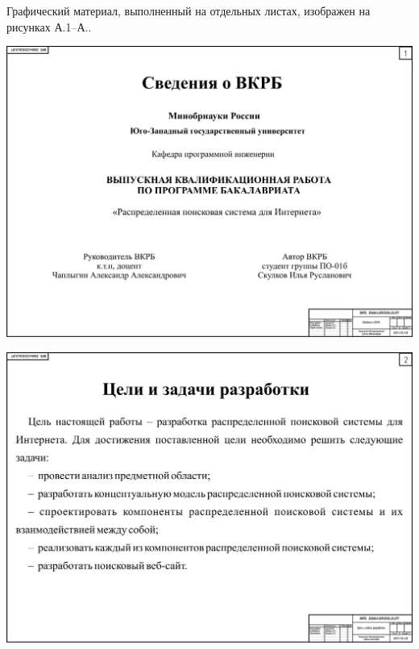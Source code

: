 
Графический материал, выполненный на отдельных листах,
изображен на рисунках А.1--А..
\setcounter{числоПлакатов}{0}

\renewcommand{\thefigure}{А.\arabic{figure}} %

\begin{landscape}

\begin{плакат}
    \includegraphics[width=0.82\linewidth]{posters/p1.eps}
    \label{p1:image}      
\end{плакат}

\begin{плакат}
    \includegraphics[width=0.82\linewidth]{posters/p2.eps}
    \label{p2:image}      
\end{плакат}


\end{landscape}
